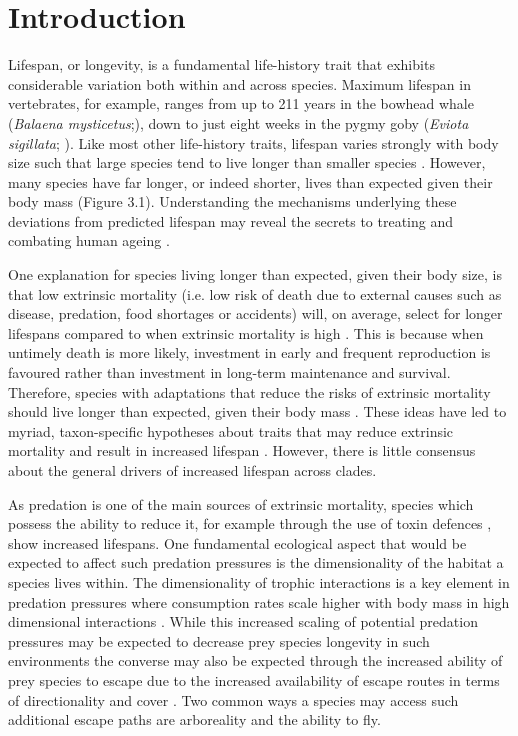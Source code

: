 \section{Introduction}

Lifespan, or longevity, is a fundamental life-history trait that exhibits considerable variation both within and across species. Maximum lifespan in vertebrates, for example, ranges from up to 211 years in the bowhead whale (\textit{Balaena mysticetus};\citep{de2009database}), down to just eight weeks in the pygmy goby (\textit{Eviota sigillata}; \citep{depczynski2005shortest}). Like most other life-history traits, lifespan varies strongly with body size such that large species tend to live longer than smaller species \citep{lindstedt1981body,promislow1993size,de2007analysis,ricklefs2010life}. However, many species have far longer, or indeed shorter, lives than expected given their body mass (Figure 3.1). Understanding the mechanisms underlying these deviations from predicted lifespan may reveal the secrets to treating and combating human ageing \citep{ricklefs2010insights,zhang2013comparative}. 

One explanation for species living longer than expected, given their body size, is that low extrinsic mortality (i.e. low risk of death due to external causes such as disease, predation, food shortages  or accidents) will, on average, select for longer lifespans compared to when extrinsic mortality is high \citep{stearns1992evolution,Williams1957}. This is because when untimely death is more likely, investment in early and frequent reproduction is favoured rather than investment in long-term maintenance and survival. Therefore, species with adaptations that reduce the risks of extrinsic mortality should live longer than expected, given their body mass \citep{partridge1993optimality}. These ideas have led to myriad, taxon-specific hypotheses about traits that may reduce extrinsic mortality and result in increased lifespan \citep{ricklefs2010insights}. However, there is little consensus about the general drivers of increased lifespan across clades.

As predation is one of the main sources of extrinsic mortality, species which possess the ability to reduce it, for example through the use of toxin defences \citep{hossie2013species}, show increased lifespans. One fundamental ecological aspect that would be expected to affect such predation pressures is the dimensionality of the habitat a species lives within. The dimensionality of trophic interactions is a key element in predation pressures where consumption rates scale higher with body mass in high dimensional interactions \citep{pawar2012dimensionality}. While this increased scaling of potential predation pressures may be expected to decrease prey species longevity in such environments the converse may also be expected through the increased ability of prey species to escape due to the increased availability of escape routes in terms of directionality and cover \citep{moller2010up}. Two common ways a species may access such additional escape paths are arboreality and the ability to fly.

